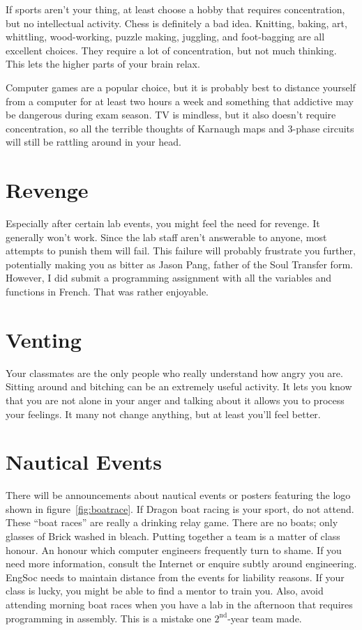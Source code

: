 \documentclass{book}
\begin{document}
If sports aren't your thing, at least choose a hobby that requires concentration, but no intellectual activity. Chess is definitely a bad idea. Knitting, baking, art, whittling, wood-working, puzzle making, juggling, and foot-bagging are all excellent choices. They require a lot of concentration, but not much thinking. This lets the higher parts of your brain relax.

Computer games are a popular choice, but it is probably best to distance yourself from a computer for at least two hours a week and something that addictive may be dangerous during exam season. TV is mindless, but it also doesn't require concentration, so all the terrible thoughts of Karnaugh maps and 3-phase circuits will still be rattling around in your head.

\section{Revenge}
Especially after certain lab events, you might feel the need for revenge. It generally won't work. Since the lab staff aren't answerable to anyone, most attempts to punish them will fail. This failure will probably frustrate you further, potentially making you as bitter as Jason Pang, father of the Soul Transfer form. However, I did submit a programming assignment with all the variables and functions in French. That was rather enjoyable.

\section{Venting}
Your classmates are the only people who really understand how angry you are. Sitting around and bitching can be an extremely useful activity. It lets you know that you are not alone in your anger and talking about it allows you to process your feelings. It many not change anything, but at least you'll feel better.

\section{Nautical Events}
There will be announcements about nautical events or posters featuring the logo shown in figure~\ref{fig:boatrace}.  If Dragon boat racing is your sport, do not attend. These ``boat races'' are really a drinking relay game. There are no boats; only glasses of Brick washed in bleach. Putting together a team is a matter of class honour. An honour which computer engineers frequently turn to shame. If you need more information, consult the Internet or enquire subtly around engineering. EngSoc needs to maintain distance from the events for liability reasons. If your class is lucky, you might be able to find a mentor to train you. Also, avoid attending morning boat races when you have a lab in the afternoon that requires programming in assembly. This is a mistake one $2^{\mathrm{nd}}$-year team made.
\end{document}
